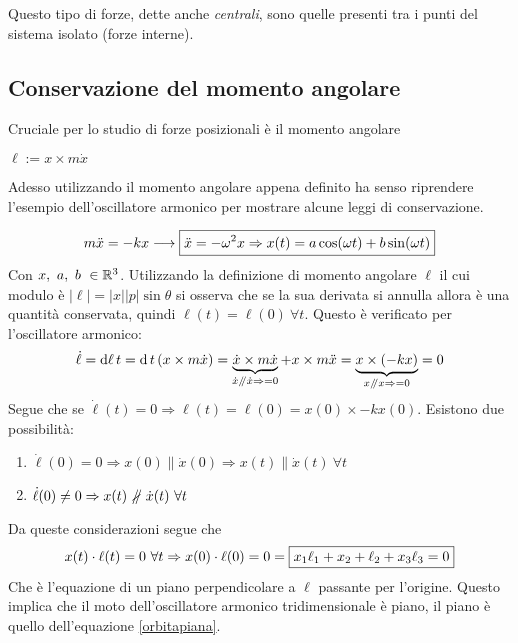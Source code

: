 \documentclass[Main.tex]{subfiles}
\begin{document}
Questo tipo di forze, dette anche \textit{centrali}, sono quelle presenti tra i punti del sistema isolato (forze interne).

\newpage
\subsection{Conservazione del momento angolare}
\noindent Cruciale per lo studio di forze posizionali è il momento angolare
\begin{df}
	$\ell := x \times m \dot x$
\end{df}
Adesso utilizzando il momento angolare appena definito ha senso riprendere l'esempio dell'oscillatore armonico per mostrare alcune leggi di conservazione.

\begin{tema} 
\begin{equation}\notag
	m \ddot x = -kx\longrightarrow \boxed{ \ddot x=-\omega^2 x\Rightarrow x(t)=a \cos(\omega t) + b \sin(\omega t)} 
\end{equation}
	Con $x, \ a, \ b \ \in \mathbb{R}^3$. Utilizzando la definizione di momento angolare $\ell$ il cui modulo è $|\ell|=|x||p|\sin \theta$ si osserva che se la sua derivata si annulla allora è una quantità conservata, quindi $\ell(t)=\ell(0) \ \forall t$. Questo è verificato per l'oscillatore armonico:
	\begin{equation}\notag
		\dot \ell = \dd{\ell}{t}= \dd{}{t}\left(x \times m \dot x\right) = \underbrace{\dot x \times m \dot x}_{\dot x \mathrel{/\mkern-5mu/} \dot x \Rightarrow=0} + x \times m \ddot x = \underbrace{x \times (-k x)}_{x \mathrel{/\mkern-5mu/} x \Rightarrow=0}=0
	\end{equation}
	Segue che se $\dot \ell(t)=0 \Rightarrow \ell(t)= \ell(0)= x(0) \times -kx(0)$. Esistono due possibilità:
	\begin{enumerate}
		\item $\dot \ell(0)=0 \Rightarrow x(0) \parallel \dot x(0) \Rightarrow x(t) \parallel \dot x(t) \ \forall t$
		\item $\dot \ell (0) \neq 0 \Rightarrow x(t) \notparallel \dot x(t) \ \forall t$
	\end{enumerate} 	
	Da queste considerazioni segue che 
\begin{equation}\label{orbitapiana} \notag
 	x(t) \cdot \ell(t) = 0 \ \forall t \Rightarrow x(0) \cdot \ell(0)=0= \boxed{x_1 \ell_1+x_2+\ell_2+x_3\ell_3=0}
 \end{equation}
Che è l'equazione di un piano perpendicolare a $\ell$ passante per l'origine. Questo implica che il moto dell'oscillatore armonico tridimensionale è piano, il piano è quello dell'equazione \eqref{orbitapiana}.


\end{tema}
\end{document}
